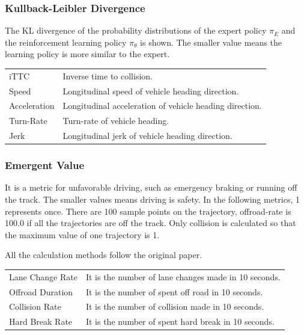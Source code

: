 \subsubsection{Kullback-Leibler Divergence}

The KL divergence of the probability distributions of the expert policy $\pi_E$ and the reinforcement learning policy $\pi_\theta$ is shown. The smaller  value means the learning policy is more similar to the expert.

\begin{tabular}{ll}
iTTC  & Inverse time to collision. \\
Speed & Longitudinal speed of vehicle heading direction. \\
Acceleration & Longitudinal acceleration of vehicle heading direction. \\
Turn-Rate & Turn-rate of vehicle heading. \\
Jerk & Longitudinal jerk of vehicle heading direction. \\
\end{tabular}


\subsubsection{Emergent Value}

It is a metric for unfavorable driving, such as emergency braking or running off the track. The smaller values means driving is safety.
In the following metrics, 1 represents once.
There are 100 sample points on the trajectory, 
offroad-rate is 100.0 if all the trajectories are off the track.
Only collision is calculated so that the maximum value of one trajectory is 1.

All the calculation methods follow the original paper.\cite{DBLP:journals/corr/KueflerMWK17}


\begin{tabular}{ll}
Lane Change Rate & It is the number of lane changes made in 10 seconds. \\
Offroad Duration & It is the number of spent off road in 10 seconds. \\
Collision Rate   & It is the number of collision made in 10 seconds. \\
Hard Break Rate  & It is the number of spent hard break in 10 seconds. \\
\end{tabular}





